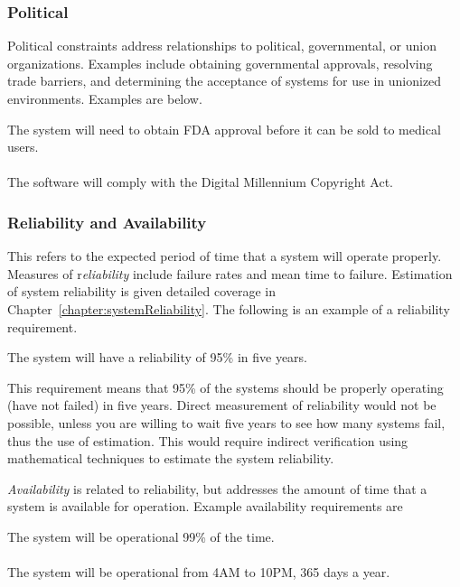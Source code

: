 \subsubsection*{Political}
\label{subsection:political}

Political constraints address relationships to political, governmental,
or union organizations. Examples include obtaining governmental
approvals, resolving trade barriers, and determining the acceptance of
systems for use in unionized environments. Examples are below.

\begin{itquote}
The system will need to obtain FDA approval before it can be sold to
medical users.\\ \\
The software will comply with the Digital Millennium Copyright Act.
\end{itquote}

\subsubsection*{Reliability and Availability}
\label{subsection:reliability-and-availability}

This refers to the expected period of time that a system will operate
properly. Measures of r\emph{eliability} include failure rates and mean
time to failure. Estimation of system reliability is given detailed
coverage in Chapter~\ref{chapter:systemReliability}. 
The following is an example of a reliability
requirement.

\begin{itquote}
The system will have a reliability of 95\% in five years.
\end{itquote}

This requirement means that 95\% of the systems should be properly
operating (have not failed) in five years. Direct measurement of
reliability would not be possible, unless you are willing to wait five
years to see how many systems fail, thus the use of estimation. This
would require indirect verification using mathematical techniques to
estimate the system reliability.

\emph{Availability} is related to reliability, but addresses the amount
of time that a system is available for operation. Example availability
requirements are

\begin{itquote}
The system will be operational 99\% of the time.\\ \\
The system will be operational from 4AM to 10PM, 365 days a year.
\end{itquote}


